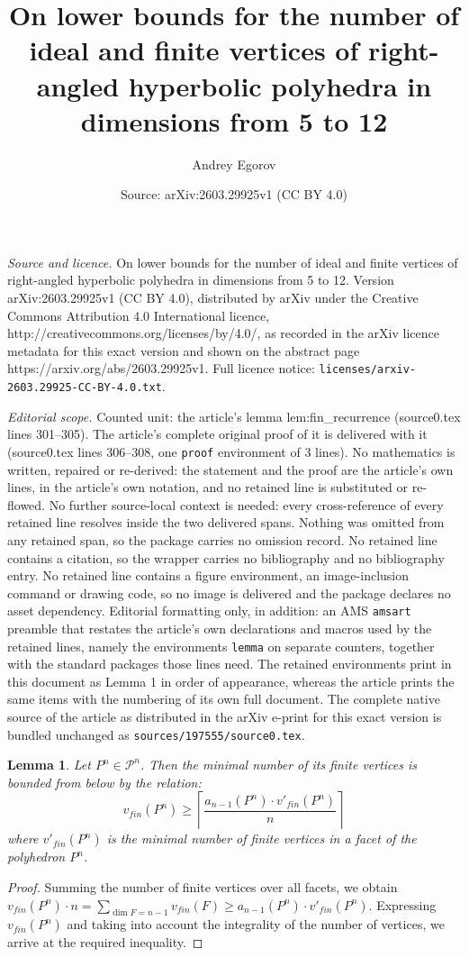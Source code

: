 \documentclass[10pt,a4paper]{amsart}
\title{On lower bounds for the number of ideal and finite vertices of right-angled hyperbolic polyhedra in dimensions from 5 to 12}
\author{Andrey Egorov}
\date{Source: arXiv:2603.29925v1 (CC BY 4.0)}
\newtheorem{lemma}{Lemma}
\begin{document}
\maketitle

\noindent\emph{Source and licence.} On lower bounds for the number of ideal and finite vertices of right-angled hyperbolic polyhedra in dimensions from 5 to 12. Version arXiv:2603.29925v1 (CC BY 4.0), distributed by arXiv under the Creative Commons Attribution 4.0 International licence, http://creativecommons.org/licenses/by/4.0/, as recorded in the arXiv licence metadata for this exact version and shown on the abstract page https://arxiv.org/abs/2603.29925v1. Full licence notice: \texttt{licenses/arxiv-2603.29925-CC-BY-4.0.txt}.\par\smallskip

\noindent\textit{Editorial scope.} Counted unit: the article's lemma lem:fin\_recurrence (source0.tex lines 301--305). The article's complete original proof of it is delivered with it (source0.tex lines 306--308, one \texttt{proof} environment of 3 lines). No mathematics is written, repaired or re-derived: the statement and the proof are the article's own lines, in the article's own notation, and no retained line is substituted or re-flowed.  No further source-local context is needed: every cross-reference of every retained line resolves inside the two delivered spans.  Nothing was omitted from any retained span, so the package carries no omission record.  No retained line contains a citation, so the wrapper carries no bibliography and no bibliography entry.  No retained line contains a figure environment, an image-inclusion command or drawing code, so no image is delivered and the package declares no asset dependency.  Editorial formatting only, in addition: an AMS \texttt{amsart} preamble that restates the article's own declarations and macros used by the retained lines, namely the environments \texttt{lemma} on separate counters, together with the standard packages those lines need.  The retained environments print in this document as Lemma 1 in order of appearance, whereas the article prints the same items with the numbering of its own full document.  The complete native source of the article as distributed in the arXiv e-print for this exact version is bundled unchanged as \texttt{sources/197555/source0.tex}.
	\begin{lemma} \label{lem:fin_recurrence}
		Let $P^n \in \mathcal{P}^n$. Then the minimal number of its finite vertices is bounded from below by the relation:
		$$v_{fin}(P^n) \ge \left\lceil \frac{a_{n-1}(P^n) \cdot v'_{fin}(P^n)}{n} \right\rceil$$
		where $v'_{fin}(P^n)$ is the minimal number of finite vertices in a facet of the polyhedron $P^n$.
	\end{lemma}

	\begin{proof}
		Summing the number of finite vertices over all facets, we obtain $v_{fin}(P^n) \cdot n = \sum_{\dim F = n-1} v_{fin}(F) \ge a_{n-1}(P^n) \cdot v'_{fin}(P^n)$. Expressing $v_{fin}(P^n)$ and taking into account the integrality of the number of vertices, we arrive at the required inequality.
	\end{proof}
\end{document}

